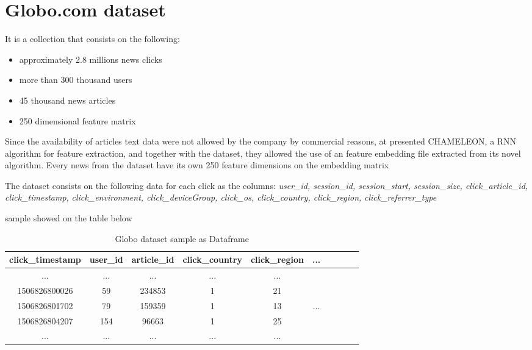 \documentclass[ecp,tc,english]{iiufrgs}
\begin{document}
    \section{Globo.com dataset} \label{globo_dot_com_dataset}
    It is a collection that consists on the following:
    \begin{itemize}
        \item approximately 2.8 millions news clicks
        \item more than 300 thousand users
        \item 45 thousand news articles
        \item 250 dimensional feature matrix
    \end{itemize}
    
    Since the availability of articles text data were not allowed by the company by commercial reasons, at \cite{deSouzaPereiraMoreira:2018:CDL:3240323.3240331} presented CHAMELEON, a RNN algorithm for feature extraction, and together with the dataset, they allowed the use of an feature embedding file extracted from its novel algorithm. Every news from the dataset have its own 250 feature dimensions on the embedding matrix
    
    The dataset consists on the following data for each click as the columns:
    \newline \textit{user\_id, session\_id, session\_start, session\_size, click\_article\_id, click\_timestamp,}
    \newline \textit{click\_environment, click\_deviceGroup, click\_os, click\_country, click\_region,}
    \newline \textit{click\_referrer\_type} 

    sample showed on the table below
    
    \begin{table}[!ht]
        \centering
        \begin{tabular}{ |c|c|c|c|c|c|c|c|c|c| } 
            \hline
            click\_timestamp & user\_id & article\_id & click\_country & click\_region & ... \\
            \hline 
            ... & ...  & ...  & ...  & ... & \\
            1506826800026 & 59 & 234853 & 1 & 21 & \\ 
            1506826801702 & 79 & 159359 & 1 & 13 & ...\\ 
            1506826804207 & 154 & 96663 & 1 & 25 & \\ 
            ... & ...  & ...  & ...  & ... & \\
            \hline
        \end{tabular}
        \caption{Globo dataset sample as Dataframe}
        \label{tab:globo_dataset_sample}
    \end{table}
\end{document}
